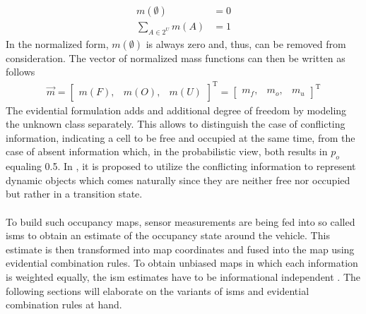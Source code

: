 \begin{align}
	\label{eq:evidential_norm}
	m(\emptyset) &= 0\\
	\sum_{A \in 2^{U}} m(A) &= 1
\end{align} 
In the normalized form, $m(\emptyset)$ is always zero and, thus, can be removed from consideration. The vector of normalized mass functions can then be written as follows
\begin{align}
	\vec{m} = \begin{bmatrix} m(F), & m(O), & m(U) \end{bmatrix}^{\text{T}} = \begin{bmatrix} m_f, & m_o, & m_u \end{bmatrix}^{\text{T}}
\end{align}
The evidential formulation adds and additional degree of freedom by modeling the unknown class separately. This allows to distinguish the case of conflicting information, indicating a cell to be free and occupied at the same time, from the case of absent information which, in the probabilistic view, both results in $p_o$ equaling 0.5. In \cite{moras2011moving,yu2015evidential,kurdej2012map}, it is proposed to utilize the conflicting information to represent dynamic objects which comes naturally since they are neither free nor occupied but rather in a transition state.
\\\\
To build such occupancy maps, sensor measurements are being fed into so called \gls{ism}s to obtain an estimate of the occupancy state around the vehicle. This estimate is then transformed into map coordinates and fused into the map using evidential combination rules. To obtain unbiased maps in which each information is weighted equally, the \gls{ism} estimates have to be informational independent \cite{pagac1996evidential}. The following sections will elaborate on the variants of \gls{ism}s and evidential combination rules at hand.
%
